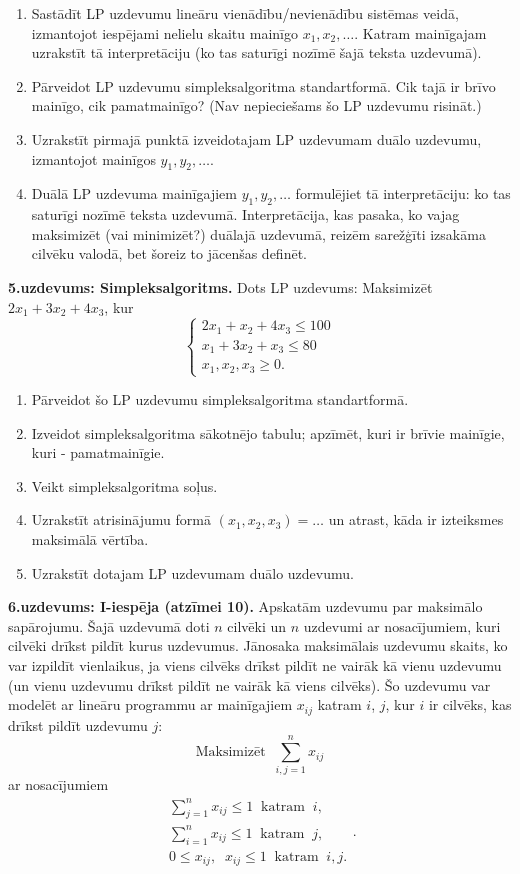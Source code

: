 \documentclass[a4paper,12pt]{article}
\begin{document}
\begin{enumerate}[label=(\alph*)]
\item Sastādīt LP uzdevumu lineāru vienādību/nevienādību sistēmas veidā, izmantojot
iespējami nelielu skaitu mainīgo $x_1,x_2,\ldots$. 
Katram mainīgajam uzrakstīt tā interpretāciju (ko tas saturīgi nozīmē
šajā teksta uzdevumā).
\item Pārveidot LP uzdevumu simpleksalgoritma standartformā. Cik 
tajā ir brīvo mainīgo, cik pamatmainīgo? (Nav nepieciešams šo LP uzdevumu risināt.)
\item Uzrakstīt pirmajā punktā izveidotajam LP uzdevumam duālo uzdevumu, izmantojot
mainīgos $y_1,y_2,\ldots$.
\item Duālā LP uzdevuma mainīgajiem $y_1,y_2,\ldots$ formulējiet tā 
interpretāciju: ko tas saturīgi nozīmē teksta uzdevumā. Interpretācija, 
kas pasaka, ko vajag maksimizēt (vai minimizēt?) duālajā uzdevumā, reizēm 
sarežģīti izsakāma cilvēku valodā, bet šoreiz to jācenšas definēt.
\end{enumerate}

\vspace{6pt}
{\bf 5.uzdevums: Simpleksalgoritms.} 
Dots LP uzdevums: Maksimizēt $2x_1 + 3x_2 + 4x_3$, kur 
$$\left\{ \begin{array}{l}
2x_1 + x_2 + 4x_3 \leq 100\\
x_1 + 3x_2 + x_3 \leq 80\\
x_1,x_2,x_3 \geq 0. \end{array} \right.$$
\begin{enumerate}[label=(\alph*)]
\item Pārveidot šo LP uzdevumu simpleksalgoritma standartformā.
\item Izveidot simpleksalgoritma sākotnējo tabulu; apzīmēt, 
kuri ir brīvie mainīgie, kuri - pamatmainīgie.
\item Veikt simpleksalgoritma soļus. 
\item Uzrakstīt atrisinājumu formā $(x_1,x_2,x_3)=\ldots$ un atrast, kāda 
ir izteiksmes maksimālā vērtība.
\item Uzrakstīt dotajam LP uzdevumam duālo uzdevumu.
\end{enumerate}

\vspace{6pt}
{\bf 6.uzdevums: I-iespēja (atzīmei 10).} 
Apskatām uzdevumu par maksimālo sapārojumu. 
Šajā uzdevumā doti $n$ cilvēki un $n$ uzdevumi ar nosacījumiem, kuri
cilvēki drīkst pildīt kurus uzdevumus. Jānosaka maksimālais uzdevumu
skaits, ko var izpildīt vienlaikus, ja viens cilvēks drīkst pildīt ne vairāk
kā vienu uzdevumu (un vienu uzdevumu drīkst pildīt ne vairāk kā viens
cilvēks). Šo uzdevumu var modelēt ar lineāru programmu ar mainīgajiem
$x_{ij}$ katram $i$, $j$, kur $i$ ir cilvēks, kas drīkst pildīt uzdevumu $j$:
$$\text{Maksimizēt}\;\;\sum\limits_{i,j=1}^{n} x_{ij}$$
ar nosacījumiem
$$\begin{array}{l}
\sum\limits_{j=1}^n x_{ij} \leq 1\;\;\text{katram}\;\;i,\\
\sum\limits_{i=1}^n x_{ij} \leq 1\;\;\text{katram}\;\;j,\\
0 \leq x_{ij},\;\;x_{ij} \leq 1\;\;\text{katram}\;\;i,j.
\end{array}.$$
\end{document}
